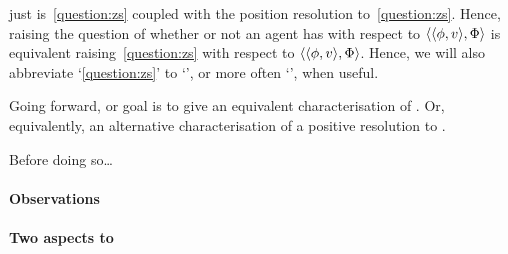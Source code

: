 \begin{note}
   just is~\autoref{question:zs} coupled with the position resolution to~\autoref{question:zs}.
  Hence, raising the question of whether or not an agent has \zs{} with respect to \(\langle \langle \phi, v \rangle, \Phi \rangle\) is equivalent raising~\autoref{question:zs} with respect to \(\langle \langle \phi, v \rangle, \Phi \rangle\).
  Hence, we will also abbreviate `\autoref{question:zs}' to `\qzs{-}', or more often `\qzs{}', when useful.

  Going forward, or goal is to give an equivalent characterisation of \zs{}.
  Or, equivalently, an alternative characterisation of a positive resolution to \qzs{}.

  {
    \color{red}
    Before doing so\dots
  }
\end{note}

\paragraph*{Observations}

\paragraph*{Two aspects to \zs{}}

